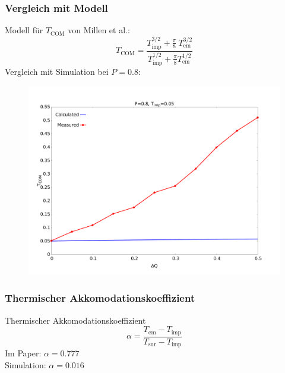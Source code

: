 \documentclass{beamer}
\begin{document}
\begin{frame}
\frametitle{Vergleich mit Modell}
Modell für $T_\text{COM}$ von Millen et al.:
\begin{equation}
    T_\text{COM} = \frac{T_\text{imp}^{3/2}+\tfrac\pi 8 \ T_\text{em}^{3/2}}{T_\text{imp}^{1/2}+\tfrac\pi8 T_\text{em}^{1/2}}
\end{equation}
Vergleich mit Simulation bei $P=0.8$:
\begin{figure}
    \begin{center}
        \includegraphics[scale=0.2]{../images/measurevscalc.pdf}
    \end{center}
\end{figure}
\end{frame}

\begin{frame}
\frametitle{Thermischer Akkomodationskoeffizient}
Thermischer Akkomodationskoeffizient
\begin{equation}
    \alpha = \frac{T_\text{em} - T_\text{imp}}{T_\text{sur} - T_\text{imp}}
\end{equation}
Im Paper: $\alpha = 0.777$ \\
Simulation: $\alpha = 0.016$

\end{frame}
\end{document}
